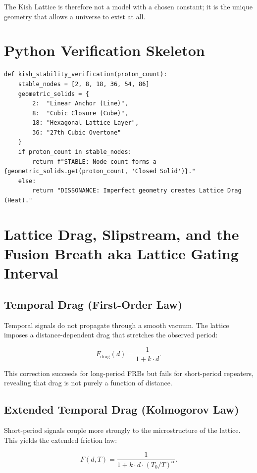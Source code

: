 \documentclass[12pt,oneside]{book}
\begin{document}
The Kish Lattice is therefore not a model with a chosen constant; it is the unique
geometry that allows a universe to exist at all.


\section{Python Verification Skeleton}

\begin{verbatim}
def kish_stability_verification(proton_count):
    stable_nodes = [2, 8, 18, 36, 54, 86]
    geometric_solids = {
        2:  "Linear Anchor (Line)",
        8:  "Cubic Closure (Cube)",
        18: "Hexagonal Lattice Layer",
        36: "27th Cubic Overtone"
    }
    if proton_count in stable_nodes:
        return f"STABLE: Node count forms a {geometric_solids.get(proton_count, 'Closed Solid')}."
    else:
        return "DISSONANCE: Imperfect geometry creates Lattice Drag (Heat)."
\end{verbatim}

\section{Lattice Drag, Slipstream, and the Fusion Breath aka Lattice Gating Interval}

\subsection{Temporal Drag (First-Order Law)}
Temporal signals do not propagate through a smooth vacuum.  
The lattice imposes a distance-dependent drag that stretches the observed period:

\begin{equation}
F_{\mathrm{drag}}(d) = \frac{1}{1 + k \cdot d}.
\end{equation}

This correction succeeds for long-period FRBs but fails for short-period repeaters, revealing that 
drag is not purely a function of distance.

\subsection{Extended Temporal Drag (Kolmogorov Law)}
Short-period signals couple more strongly to the microstructure of the lattice.  
This yields the extended friction law:

\begin{equation}
F(d,T) = \frac{1}{1 + k \cdot d \cdot (T_0/T)^\alpha}.
\end{equation}
\end{document}
